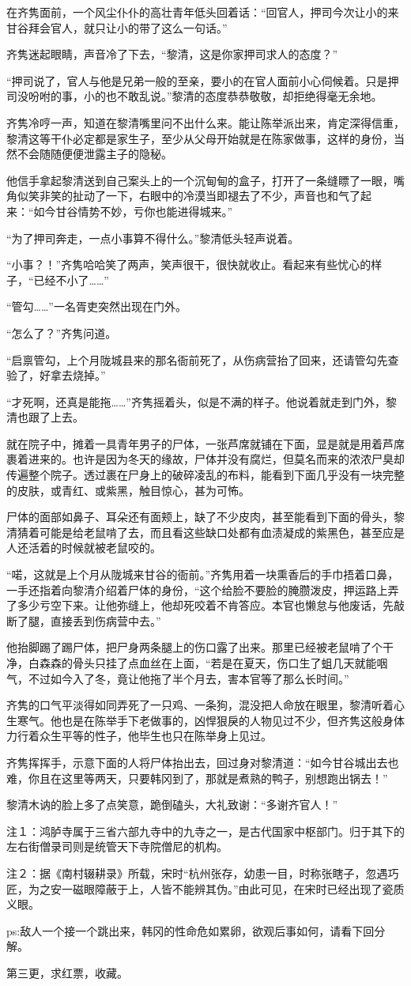 在齐隽面前，一个风尘仆仆的高壮青年低头回着话：“回官人，押司今次让小的来甘谷拜会官人，就只让小的带了这么一句话。”

齐隽迷起眼睛，声音冷了下去，“黎清，这是你家押司求人的态度？”

“押司说了，官人与他是兄弟一般的至亲，要小的在官人面前小心伺候着。只是押司没吩咐的事，小的也不敢乱说。”黎清的态度恭恭敬敬，却拒绝得毫无余地。

齐隽冷哼一声，知道在黎清嘴里问不出什么来。能让陈举派出来，肯定深得信重，黎清这等干仆必定都是家生子，至少从父母开始就是在陈家做事，这样的身份，当然不会随随便便泄露主子的隐秘。

他信手拿起黎清送到自己案头上的一个沉甸甸的盒子，打开了一条缝瞟了一眼，嘴角似笑非笑的扯动了一下，右眼中的冷漠当即褪去了不少，声音也和气了起来：“如今甘谷情势不妙，亏你也能进得城来。”

“为了押司奔走，一点小事算不得什么。”黎清低头轻声说着。

“小事？！”齐隽哈哈笑了两声，笑声很干，很快就收止。看起来有些忧心的样子，“已经不小了……”

“管勾……”一名胥吏突然出现在门外。

“怎么了？”齐隽问道。

“启禀管勾，上个月陇城县来的那名衙前死了，从伤病营抬了回来，还请管勾先查验了，好拿去烧掉。”

“才死啊，还真是能拖……”齐隽摇着头，似是不满的样子。他说着就走到门外，黎清也跟了上去。

就在院子中，摊着一具青年男子的尸体，一张芦席就铺在下面，显是就是用着芦席裹着进来的。也许是因为冬天的缘故，尸体并没有腐烂，但莫名而来的浓浓尸臭却传遍整个院子。透过裹在尸身上的破碎凌乱的布料，能看到下面几乎没有一块完整的皮肤，或青红、或紫黑，触目惊心，甚为可怖。

尸体的面部如鼻子、耳朵还有面颊上，缺了不少皮肉，甚至能看到下面的骨头，黎清猜着可能是给老鼠啃了去，而且看这些缺口处都有血渍凝成的紫黑色，甚至应是人还活着的时候就被老鼠咬的。

“喏，这就是上个月从陇城来甘谷的衙前。”齐隽用着一块熏香后的手巾捂着口鼻，一手还指着向黎清介绍着尸体的身份，“这个给脸不要脸的腌臜泼皮，押运路上弄了多少亏空下来。让他弥缝上，他却死咬着不肯答应。本官也懒怠与他废话，先敲断了腿，直接丢到伤病营中去。”

他抬脚踢了踢尸体，把尸身两条腿上的伤口露了出来。那里已经被老鼠啃了个干净，白森森的骨头只挂了点血丝在上面，“若是在夏天，伤口生了蛆几天就能咽气，不过如今入了冬，竟让他拖了半个月去，害本官等了那么长时间。”

齐隽的口气平淡得如同弄死了一只鸡、一条狗，混没把人命放在眼里，黎清听着心生寒气。他也是在陈举手下老做事的，凶悍狠戾的人物见过不少，但齐隽这般身体力行着众生平等的性子，他毕生也只在陈举身上见过。

齐隽挥挥手，示意下面的人将尸体抬出去，回过身对黎清道：“如今甘谷城出去也难，你且在这里等两天，只要韩冈到了，那就是煮熟的鸭子，别想跑出锅去！”

黎清木讷的脸上多了点笑意，跪倒磕头，大礼致谢：“多谢齐官人！”

注１：鸿胪寺属于三省六部九寺中的九寺之一，是古代国家中枢部门。归于其下的左右街僧录司则是统管天下寺院僧尼的机构。

注２：据《南村辍耕录》所载，宋时“杭州张存，幼患一目，时称张瞎子，忽遇巧匠，为之安一磁眼障蔽于上，人皆不能辨其伪。”由此可见，在宋时已经出现了瓷质义眼。

ps:敌人一个接一个跳出来，韩冈的性命危如累卵，欲观后事如何，请看下回分解。

第三更，求红票，收藏。

